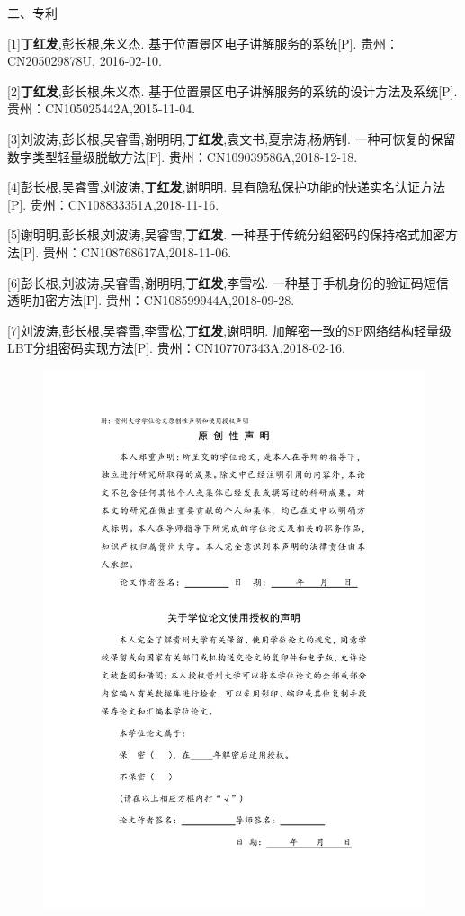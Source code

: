 \documentclass[pdftex,notypeinfo,twoside,openany,UTF8,fntef]{CASthesis}
\begin{document}
\begin{resumelist}{二、专利}

[1]\textbf{丁红发},彭长根,朱义杰. 基于位置景区电子讲解服务的系统[P]. 贵州：CN205029878U, 2016-02-10.

[2]\textbf{丁红发},彭长根,朱义杰. 基于位置景区电子讲解服务的系统的设计方法及系统[P]. 贵州：CN105025442A,2015-11-04.

[3]刘波涛,彭长根,吴睿雪,谢明明,\textbf{丁红发},袁文书,夏宗涛,杨炳钊. 一种可恢复的保留数字类型轻量级脱敏方法[P]. 贵州：CN109039586A,2018-12-18.

[4]彭长根,吴睿雪,刘波涛,\textbf{丁红发},谢明明. 具有隐私保护功能的快递实名认证方法[P]. 贵州：CN108833351A,2018-11-16.

[5]谢明明,彭长根,刘波涛,吴睿雪,\textbf{丁红发}. 一种基于传统分组密码的保持格式加密方法[P]. 贵州：CN108768617A,2018-11-06.

[6]彭长根,刘波涛,吴睿雪,谢明明,\textbf{丁红发},李雪松. 一种基于手机身份的验证码短信透明加密方法[P]. 贵州：CN108599944A,2018-09-28.

[7]刘波涛,彭长根,吴睿雪,李雪松,\textbf{丁红发},谢明明. 加解密一致的SP网络结构轻量级LBT分组密码实现方法[P]. 贵州：CN107707343A,2018-02-16.

\end{resumelist}


 \pagestyle{empty}
\begin{center}
\begin{figure}
  \centering
  \includegraphics[width=\textwidth]{shengming.pdf}
\end{figure}
\end{center}
\end{document}
